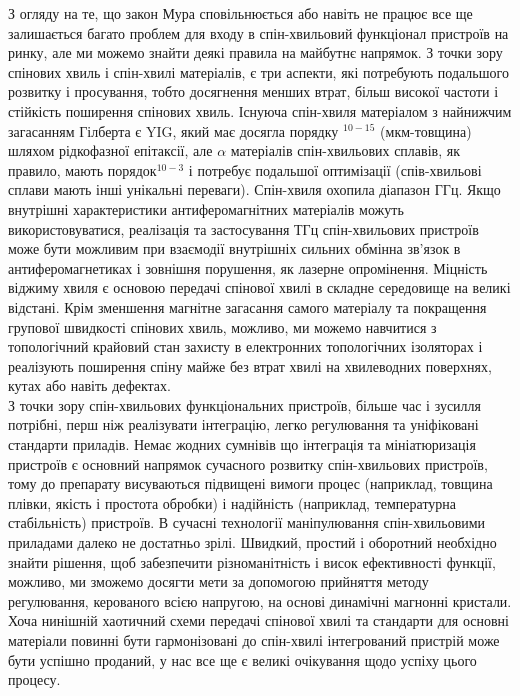 \documentclass[a4paper,14pt]{extreport}
\begin{document}
З огляду на те, що закон Мура сповільнюється або навіть не працює
все ще залишається багато проблем для входу в спін-хвильовий функціонал
пристроїв на ринку, але ми можемо знайти деякі правила на майбутнє
напрямок. З точки зору спінових хвиль і спін-хвилі
матеріалів, є три аспекти, які потребують подальшого розвитку
і просування, тобто досягнення менших втрат, більш високої частоти
і стійкість поширення спінових хвиль. Існуюча спін-хвиля
матеріалом з найнижчим загасанням Гілберта є YIG, який має
досягла порядку $^{10-15}$ (мкм-товщина) шляхом рідкофазної епітаксії, але $\alpha$ матеріалів спін-хвильових сплавів, як правило, мають порядок$^{10-3}$ і потребує подальшої оптимізації (спів-хвильові сплави мають
інші унікальні переваги). Спін-хвиля охопила діапазон ГГц.
Якщо внутрішні характеристики антиферомагнітних матеріалів можуть
використовуватися, реалізація та застосування ТГц спін-хвильових пристроїв
може бути можливим при взаємодії внутрішніх сильних
обмінна зв'язок в антиферомагнетиках і зовнішня
порушення, як лазерне опромінення. Міцність віджиму
хвиля є основою передачі спінової хвилі в
складне середовище на великі відстані. Крім зменшення
магнітне загасання самого матеріалу та покращення групової швидкості спінових хвиль, можливо, ми можемо навчитися з
топологічний крайовий стан захисту в електронних топологічних ізоляторах і реалізують поширення спіну майже без втрат
хвилі на хвилеводних поверхнях, кутах або навіть дефектах.\\

З точки зору спін-хвильових функціональних пристроїв, більше
час і зусилля потрібні, перш ніж реалізувати інтеграцію, легко
регулювання та уніфіковані стандарти приладів. Немає жодних сумнівів
що інтеграція та мініатюризація пристроїв є
основний напрямок сучасного розвитку спін-хвильових пристроїв,
тому до препарату висуваються підвищені вимоги
процес (наприклад, товщина плівки, якість і простота обробки)
і надійність (наприклад, температурна стабільність) пристроїв. В
сучасні технології маніпулювання спін-хвильовими приладами
далеко не достатньо зрілі. Швидкий, простий і оборотний
необхідно знайти рішення, щоб забезпечити різноманітність і висок
ефективності функції, можливо, ми зможемо досягти мети за допомогою
прийняття методу регулювання, керованого всією напругою, на основі
динамічні магнонні кристали. Хоча нинішній хаотичний
схеми передачі спінової хвилі та стандарти для
основні матеріали повинні бути гармонізовані до спін-хвилі
інтегрований пристрій може бути успішно проданий, у нас все ще є
великі очікування щодо успіху цього процесу.
\end{document}
